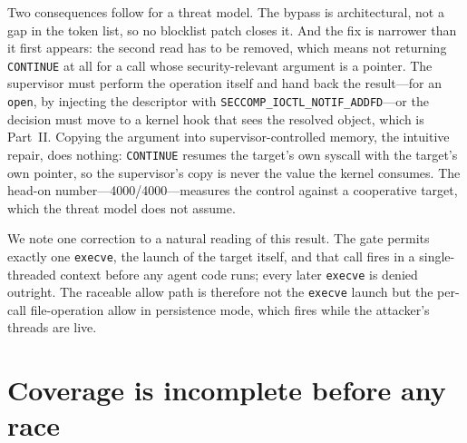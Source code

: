 \documentclass[11pt]{article}
\newcommand{\Nrace}{4000}
\begin{document}
Two consequences follow for a threat model. The bypass is architectural, not a gap in the token list,
so no blocklist patch closes it. And the fix is narrower than it first appears: the second read has to
be removed, which means not returning \texttt{CONTINUE} at all for a call whose security-relevant
argument is a pointer. The supervisor must perform the operation itself and hand back the result---for
an \texttt{open}, by injecting the descriptor with \texttt{SECCOMP\_IOCTL\_NOTIF\_ADDFD}---or the
decision must move to a kernel hook that sees the resolved object, which is Part~II. Copying the
argument into supervisor-controlled memory, the intuitive repair, does nothing: \texttt{CONTINUE}
resumes the target's own syscall with the target's own pointer, so the supervisor's copy is never the
value the kernel consumes. The head-on number---\Nrace/\Nrace{}---measures the control against a
cooperative target, which the threat model does not assume.

We note one correction to a natural reading of this result. The gate permits exactly one
\texttt{execve}, the launch of the target itself, and that call fires in a single-threaded context
before any agent code runs; every later \texttt{execve} is denied outright. The raceable allow path is
therefore not the \texttt{execve} launch but the per-call file-operation allow in persistence mode,
which fires while the attacker's threads are live.

\section{Coverage is incomplete before any race}\label{sec:coverage}
\end{document}
